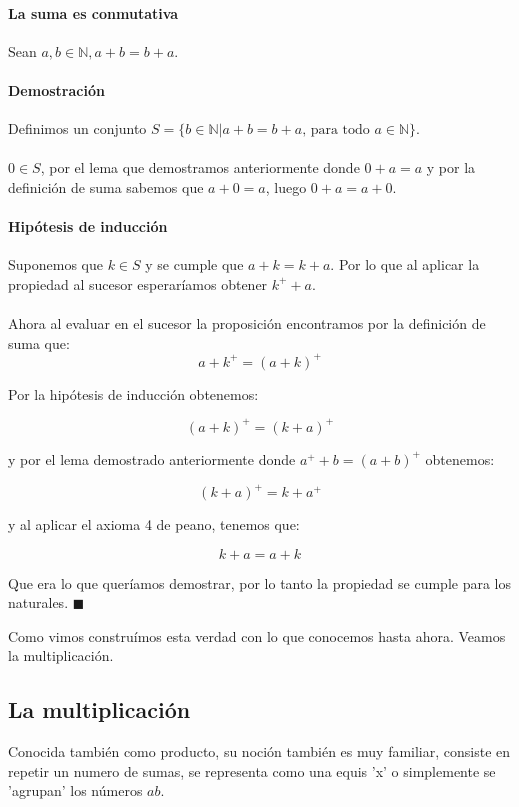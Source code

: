 \documentclass{article}
\begin{document}
\paragraph{La suma es conmutativa} Sean $a,b \in \mathbb{N}, a + b = b + a$.

\paragraph{Demostración} Definimos un conjunto $S = \{b \in \mathbb{N}|a + b = b + a\text{, para todo } a \in \mathbb{N}\}$.

\paragraph{} $0 \in S$, por el lema que demostramos anteriormente donde $0 + a = a$ y por la definición de suma sabemos que $a + 0 = a$, luego $0 + a = a + 0$.

\paragraph{Hipótesis de inducción} Suponemos que $k \in S$ y se cumple que $a + k = k + a$. Por lo que al aplicar la propiedad al sucesor esperaríamos obtener $k^+ + a$.

\paragraph{} Ahora al evaluar en el sucesor la proposición encontramos por la definición de suma que:
$$a + k^+ = (a + k)^+$$

Por la hipótesis de inducción obtenemos:

$$(a + k)^+ = (k + a)^+$$

y por el lema demostrado anteriormente donde $a^+ + b = (a + b)^+$ obtenemos:

$$(k + a)^+ = k + a^+$$

y al aplicar el axioma 4 de peano, tenemos que:

$$k + a = a + k$$

Que era lo que queríamos demostrar, por lo tanto la propiedad se cumple para los naturales. $\blacksquare$

Como vimos construímos esta verdad con lo que conocemos hasta ahora. Veamos la multiplicación.

\subsection{La multiplicación}
Conocida también como producto, su noción también es muy familiar, consiste en repetir un numero de sumas, se representa como una equis 'x' o simplemente se 'agrupan' los números $ab$.
\end{document}
